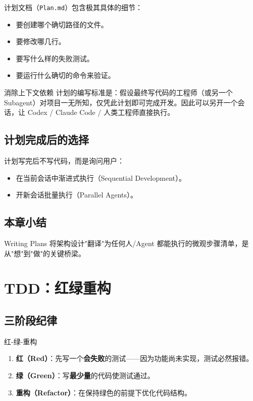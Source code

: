 \documentclass[a4paper]{article}
\begin{document}
计划文档（\texttt{Plan.md}）包含极其具体的细节：
\begin{itemize}
    \item 要创建哪个确切路径的文件。
    \item 要修改哪几行。
    \item 要写什么样的失败测试。
    \item 要运行什么确切的命令来验证。
\end{itemize}

\begin{knowledgebox}{消除上下文依赖}
计划的编写标准是：假设最终写代码的工程师（或另一个 Subagent）对项目一无所知，仅凭此计划即可完成开发。因此可以另开一个会话，让 Codex / Claude Code / 人类工程师直接执行。
\end{knowledgebox}

\subsection{计划完成后的选择}

计划写完后不写代码，而是询问用户：
\begin{itemize}
    \item 在当前会话中渐进式执行（Sequential Development）。
    \item 开新会话批量执行（Parallel Agents）。
\end{itemize}

\subsection{本章小结}

Writing Plans 将架构设计"翻译"为任何人/Agent 都能执行的微观步骤清单，是从"想"到"做"的关键桥梁。


\section{TDD：红绿重构}

\subsection{三阶段纪律}

\begin{importantbox}{红-绿-重构}
\begin{enumerate}
    \item \textbf{红（Red）}：先写一个\textbf{会失败}的测试——因为功能尚未实现，测试必然报错。
    \item \textbf{绿（Green）}：写\textbf{最少量}的代码使测试通过。
    \item \textbf{重构（Refactor）}：在保持绿色的前提下优化代码结构。
\end{enumerate}
\end{importantbox}
\end{document}
